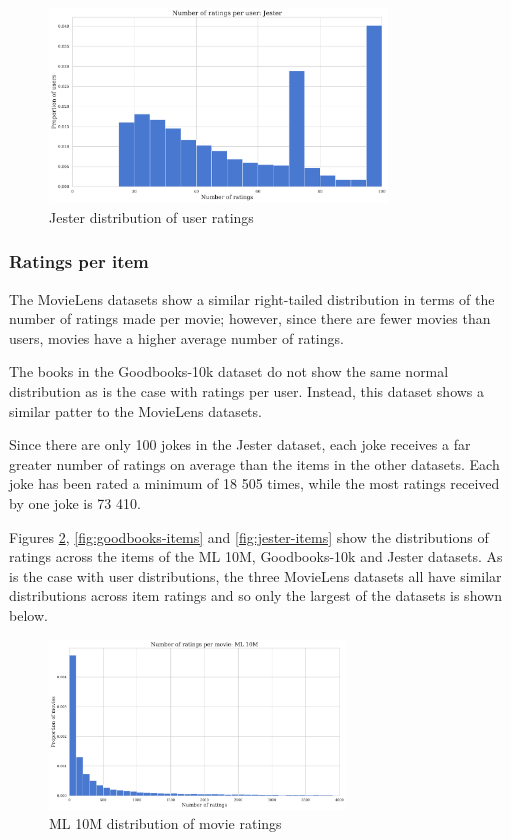 \begin{figure}[H]
\centering
\includegraphics[width=0.8\textwidth]{Figures/3_ratings-distributions/jester_user-ratings.pdf}
\caption{Jester distribution of user ratings}
\label{fig:jester-users}
\end{figure}

\subsubsection{Ratings per item}
The MovieLens datasets show a similar right-tailed distribution in terms of the number of ratings made per movie; however, since there are fewer movies than users, movies have a higher average number of ratings.

The books in the Goodbooks-10k dataset do not show the same normal distribution as is the case with ratings per user. Instead, this dataset shows a similar patter to the MovieLens datasets.

Since there are only 100 jokes in the Jester dataset, each joke receives a far greater number of ratings on average than the items in the other datasets. Each joke has been rated a minimum of 18 505 times, while the most ratings received by one joke is 73 410.

Figures \ref{fig:ML10M-items}, \ref{fig:goodbooks-items} and \ref{fig:jester-items} show the distributions of ratings across the items of the ML 10M, Goodbooks-10k and Jester datasets. As is the case with user distributions, the three MovieLens datasets all have similar distributions across item ratings and so only the largest of the datasets is shown below.

\begin{figure}[H]
\centering
\includegraphics[width=0.7\textwidth]{Figures/3_ratings-distributions/ml_10m_movie-ratings.pdf}
\caption{ML 10M distribution of movie ratings}
\label{fig:ML10M-items}
\end{figure}

